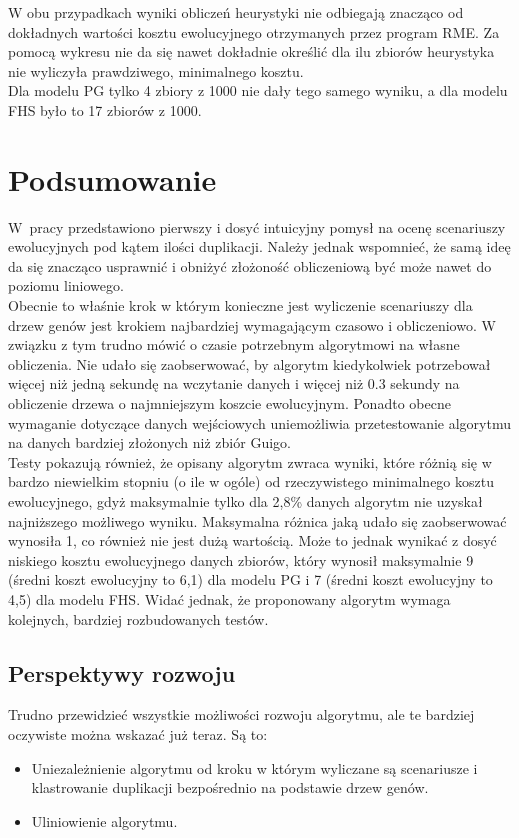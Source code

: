 \documentclass[licencjacka]{pracamgr}
\begin{document}
W obu przypadkach wyniki obliczeń heurystyki nie odbiegają znacząco od dokładnych wartości kosztu ewolucyjnego otrzymanych przez program RME. Za pomocą wykresu nie da się nawet dokładnie określić dla ilu zbiorów heurystyka nie wyliczyła prawdziwego, minimalnego kosztu.\\
Dla modelu PG tylko 4 zbiory z 1000 nie dały tego samego wyniku, a dla modelu FHS było to 17 zbiorów z 1000.

\chapter{Podsumowanie}

W~pracy przedstawiono pierwszy i dosyć intuicyjny pomysł na ocenę scenariuszy ewolucyjnych pod kątem ilości duplikacji. Należy jednak wspomnieć, że samą ideę da się znacząco usprawnić i obniżyć złożoność obliczeniową być może nawet do poziomu liniowego. 
\\
Obecnie to właśnie krok w którym konieczne jest wyliczenie scenariuszy dla drzew genów jest krokiem najbardziej wymagającym czasowo i obliczeniowo.  W związku z tym trudno mówić o czasie potrzebnym algorytmowi na własne obliczenia. Nie udało się zaobserwować, by algorytm kiedykolwiek potrzebował więcej niż jedną sekundę na wczytanie danych i więcej niż 0.3 sekundy na obliczenie drzewa o najmniejszym koszcie ewolucyjnym. Ponadto obecne wymaganie dotyczące danych wejściowych uniemożliwia  przetestowanie algorytmu na danych bardziej złożonych niż zbiór Guigo. 
\\
Testy pokazują również, że opisany algorytm zwraca wyniki, które różnią się w bardzo niewielkim stopniu (o ile w ogóle) od rzeczywistego minimalnego kosztu ewolucyjnego, gdyż maksymalnie tylko dla 2,8\% danych algorytm nie uzyskał najniższego możliwego wyniku. Maksymalna różnica jaką udało się zaobserwować wynosiła 1, co również nie jest dużą wartością. Może to jednak wynikać z dosyć niskiego kosztu ewolucyjnego danych zbiorów, który wynosił maksymalnie 9 (średni koszt ewolucyjny to 6,1) dla modelu PG i 7 (średni koszt ewolucyjny to 4,5) dla modelu FHS. Widać jednak, że proponowany algorytm wymaga kolejnych, bardziej rozbudowanych testów.


\section{Perspektywy rozwoju}

Trudno przewidzieć wszystkie możliwości rozwoju algorytmu, ale te bardziej
oczywiste można wskazać już teraz.  Są to:
\begin{itemize}
\item Uniezależnienie algorytmu od kroku w którym wyliczane są scenariusze i klastrowanie duplikacji bezpośrednio na podstawie drzew genów.
\item Uliniowienie algorytmu.
\end{itemize}
\end{document}
